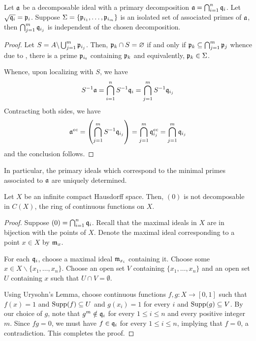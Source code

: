 \begin{theorem}
    Let $\mathfrak a$ be a decomposable ideal with a primary decomposition $\mathfrak a = \bigcap_{i = 1}^n\mathfrak q_i$. Let $\sqrt{\mathfrak q_i} = \mathfrak p_i$. Suppose $\Sigma = \{\mathfrak p_{i_1},\ldots,\mathfrak p_{i_m}\}$ is an isolated set of associated primes of $\mathfrak a$, then $\bigcap_{j = 1}^m\mathfrak q_{i_j}$ is independent of the chosen decomposition.
\end{theorem}
\begin{proof}
    Let $S = A\backslash\bigcup_{j = 1}^m\mathfrak p_{i_j}$. Then, $\mathfrak p_k\cap S = \varnothing$ if and only if $\mathfrak p_k\subseteq\bigcap_{j = 1}^m\mathfrak p_j$ whence due to , there is a prime $\mathfrak p_{i_t}$ containing $\mathfrak p_k$ and equivalently, $\mathfrak p_k\in\Sigma$. 

    Whence, upon localizing with $S$, we have 
    \begin{equation*}
        S^{-1}\mathfrak a = \bigcap_{i = 1}^n S^{-1}\mathfrak q_i = \bigcap_{j = 1}^m S^{-1}\mathfrak q_{i_j}
    \end{equation*}
    Contracting both sides, we have 
    \begin{equation*}
        \mathfrak a^{ec} = \left(\bigcap_{j = 1}^m S^{-1}\mathfrak q_{i_j}\right) = \bigcap_{j = 1}^m\mathfrak q_{i_j}^{ec} = \bigcap_{j = 1}^m\mathfrak q_{i_j}
    \end{equation*}
    and the conclusion follows.
\end{proof}

\begin{corollary}
    In particular, the primary ideals which correspond to the minimal primes associated to $\mathfrak a$ are uniquely determined.
\end{corollary}

\begin{proposition}
    Let $X$ be an infinite compact Hausdorff space. Then, $(0)$ is not decomposable in $C(X)$, the ring of continuous functions on $X$.
\end{proposition}
\begin{proof}
    Suppose $(0) = \bigcap_{i = 1}^n\mathfrak q_i$. Recall that the maximal ideals in $X$ are in bijection with the points of $X$. Denote the maximal ideal corresponding to a point $x\in X$ by $\mathfrak m_x$. 

    For each $\mathfrak q_i$, choose a maximal ideal $\mathfrak m_{x_i}$ containing it. Choose some $x\in X\backslash\{x_1,\dots,x_n\}$. Choose an open set $V$ containing $\{x_1,\dots,x_n\}$ and an open set $U$ containing $x$ such that $U\cap V = \emptyset$. 

    Using Urysohn's Lemma, choose continuous functions $f,g: X\to[0,1]$ such that $f(x) = 1$ and $\operatorname{Supp}(f)\subseteq U$ and $g(x_i) = 1$ for every $i$ and $\operatorname{Supp}(g)\subseteq V$. By our choice of $g$, note that $g^m\notin\mathfrak q_i$ for every $1\le i\le n$ and every positive integer $m$. Since $fg = 0$, we must have $f\in\mathfrak q_i$ for every $1\le i\le n$, implying that $f = 0$, a contradiction. This completes the proof.
\end{proof}

